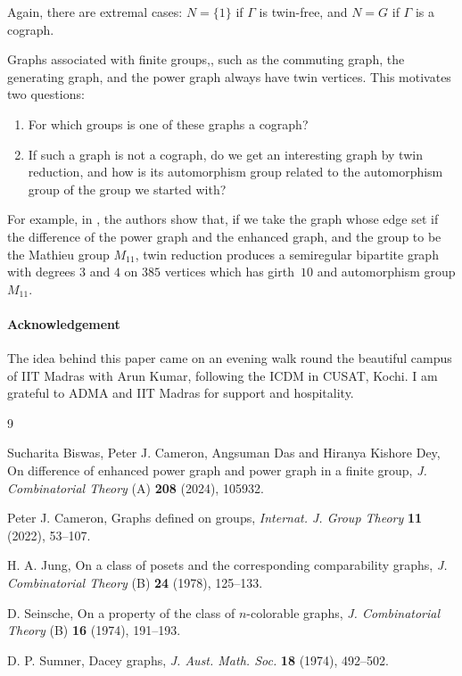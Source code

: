 \documentclass[12pt]{article}
\begin{document}
Again, there are extremal cases: $N=\{1\}$ if $\Gamma$ is twin-free, and
$N=G$ if $\Gamma$ is a  cograph.

\bigskip

Graphs associated with finite groups,, such as the commuting graph, the
generating graph, and the power graph always have twin vertices. This
motivates two questions:
\begin{enumerate}
\item For which groups is one of these graphs a cograph?
\item If such a graph is not a cograph, do we get an interesting graph by
twin reduction, and how is its automorphism group related to the automorphism
group of the group we started with?
\end{enumerate}
For example, in \cite{diff}, the authors show that, if we take the graph
whose edge set if the difference of the power graph and the enhanced graph,
and the group to be the Mathieu group $M_{11}$, twin reduction produces a
semiregular bipartite graph with degrees $3$ and $4$ on $385$ vertices which
has girth~$10$ and automorphism group $M_{11}$.

\paragraph{Acknowledgement} The idea behind this paper came on an evening walk
round the beautiful campus of IIT Madras with Arun Kumar, following the ICDM
in CUSAT, Kochi. I am grateful to ADMA and IIT Madras for support and
hospitality.

\begin{thebibliography}{9}

Sucharita Biswas, Peter J. Cameron, Angsuman Das and Hiranya Kishore Dey,
On difference of enhanced power graph and power graph in a finite group,
\textit{J. Combinatorial Theory} (A) \textbf{208} (2024), 105932.

Peter J. Cameron, 
Graphs defined on groups, 
\textit{Internat. J. Group Theory} \textbf{11} (2022), 53--107.

H. A. Jung,
On a class of posets and the corresponding comparability graphs,
\textit{J. Combinatorial Theory} (B) \textbf{24} (1978), 125--133.

D. Seinsche,
On a property of the class of $n$-colorable graphs,
\textit{J. Combinatorial Theory} (B) \textbf{16} (1974), 191--193.

D. P. Sumner,
Dacey graphs,
\textit{J. Aust. Math. Soc.} \textbf{18} (1974), 492--502.

\end{thebibliography}
\end{document}
